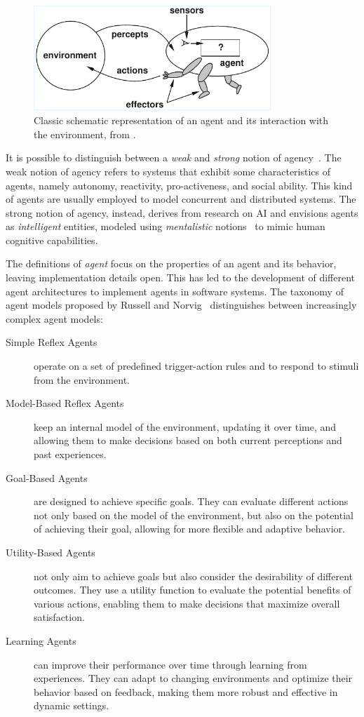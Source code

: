 \begin{figure}[t]
    \centering
    \includegraphics[width=0.8\textwidth]{figures/agent-environment-original.pdf}
    \caption{Classic schematic representation of an agent and its interaction with the environment, from \cite{1995russell-norvig}.}
    \label{fig:agent-environment}
\end{figure}

It is possible to distinguish between a \emph{weak} and \emph{strong} notion of agency~\cite{wooldridge1995ker}.
%
The weak notion of agency refers to systems that exhibit some characteristics of agents, namely autonomy, reactivity, pro-activeness, and social ability. 
%
This kind of agents are usually employed to model concurrent and distributed systems. 
%
The strong notion of agency, instead, derives from research on \ac{AI} and envisions agents as \emph{intelligent} entities, modeled using \emph{mentalistic} notions~\cite{Shoham_1993} to mimic human cognitive capabilities. 

The definitions of \emph{agent} focus on the properties of an agent and its behavior, leaving implementation details open. 
%
This has led to the development of different agent architectures to implement agents in software systems. 
%
The taxonomy of agent models proposed by Russell and Norvig~\cite{1995russell-norvig} distinguishes between increasingly complex agent models: 
\begin{description}
    \item[Simple Reflex Agents] operate on a set of predefined trigger-action rules and to respond to stimuli from the environment.
    \item[Model-Based Reflex Agents] keep an internal model of the environment, updating it over time, and allowing them to make decisions based on both current perceptions and past experiences.
    \item[Goal-Based Agents] are designed to achieve specific goals. They can evaluate different actions not only based on the model of the environment, but also on the potential of achieving their goal, allowing for more flexible and adaptive behavior.
    \item[Utility-Based Agents] not only aim to achieve goals but also consider the desirability of different outcomes. They use a utility function to evaluate the potential benefits of various actions, enabling them to make decisions that maximize overall satisfaction.
    \item[Learning Agents] can improve their performance over time through learning from experiences. They can adapt to changing environments and optimize their behavior based on feedback, making them more robust and effective in dynamic settings.
\end{description}

